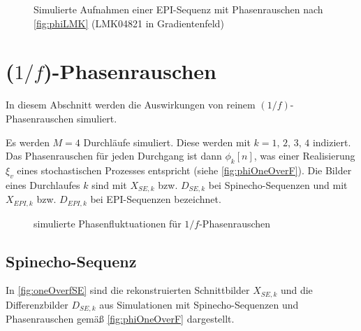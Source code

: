 \begin{figure}[H]
	\hfill
	\hfill
	\caption[LMK04821 Phasenrauschen (EPI-Sequenz)]{Simulierte Aufnahmen einer EPI-Sequenz mit Phasenrauschen nach \autoref{fig:phiLMK} (LMK04821 in Gradientenfeld)}
	\label{fig:lmkEPI}	
\end{figure}









\clearpage
\section{($1/f$)-Phasenrauschen}
In diesem Abschnitt werden die Auswirkungen von reinem $(1/f)$-Phasenrauschen simuliert.

Es werden $M=4$ Durchläufe simuliert. Diese werden mit $k=1,\,2,\,3,\,4$ indiziert. Das Phasenrauschen für jeden Durchgang ist dann $\phi_k[n]$, was einer Realisierung $\xi_v$ eines stochastischen Prozesses entspricht (siehe \autoref{fig:phiOneOverF}). Die Bilder eines Durchlaufes $k$ sind mit $X_{SE,k}$ bzw. $D_{SE,k}$ bei Spinecho-Sequenzen und mit $X_{EPI,k}$ bzw. $D_{EPI,k}$ bei EPI-Sequenzen bezeichnet.

\begin{figure}[H]
	\centering
	\caption[simulierte Phasenfluktuationen für $1/f$-Phasenrauschen]{simulierte Phasenfluktuationen für $1/f$-Phasenrauschen}
	\label{fig:phiOneOverF}
\end{figure}

\clearpage
\subsection{Spinecho-Sequenz}
In \autoref{fig:oneOverfSE} sind die rekonstruierten Schnittbilder $X_{SE,k}$ und die Differenzbilder $D_{SE,k}$ aus Simulationen mit Spinecho-Sequenzen und Phasenrauschen gemäß \autoref{fig:phiOneOverF} dargestellt.

